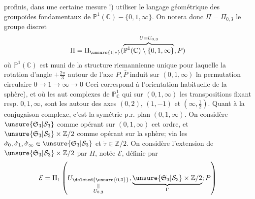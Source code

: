 profinis, dans une certaine mesure !) utiliser le langage géométrique des groupoïdes fondamentaux de $\mathbb P^1(\mathbb C)-\{0,1,\infty\}$. On  notera donc $\Pi=\Pi_{0,3}$ le groupe discret
\[
\Pi=\Pi_{\unsure{1|*}}(\overbrace{\mathbb P^1(\mathbb C)\setminus\{0,1,\infty\}}^{U=U_{0,3}},P)
\]
où $\mathbb P^1(\mathbb C)$ est muni de la structure  riemannienne  unique pour laquelle la rotation \inserted{$\dot\rho$} d'angle $+\frac{2\pi}{3}$ autour de l'axe $P,\bar P$  induit sur $(0,1,\infty)$ la permutation circulaire $0\longrightarrow1\longrightarrow\infty\longrightarrow0$ Ceci correspond à l'orientation habituelle de la sphère), et où les aut complexes  de $\mathbb P^1_{\mathbb C}$ qui     sur $(0,1,\infty)$ les transpositions fixant resp. $0,1,\infty$, sont  les   autour des axes  $(0,2)$, $(1,-1)$ et $(\infty,\frac12)$.
Quant à la conjugaison complexe, c'est la symétrie p.r.  plan $(0,1,\infty)$. On considère $\unsure{\mathfrak S_3|\mathcal S_3}$ comme opérant sur $(0,1,\infty)$  cet ordre, et $\unsure{\mathfrak S_3|\mathcal S_3}\times\mathbb Z/2$ comme opérant sur la sphère; via les $\dot\sigma_0,\dot\sigma_1,\dot\sigma_\infty\in\unsure{\mathfrak S_3|\mathcal S_3}$ et $\dot\tau\in\mathbb Z/2$. On considère l'extension  de $\unsure{\mathfrak S_3|\mathcal S_3}\times\mathbb Z/2$ par $\Pi$, notée  $\mathcal E$, définie par
\[
\mathcal E=\Pi_1\left(\underset{\substack{\Vert\\U_{0,3}}}{U_{\deleted{\unsure{0,3}}}},\underbrace{\unsure{\mathfrak S_3|\mathcal S_3}\times\mathbb Z/2}_{\Gamma};P\right)
\]
